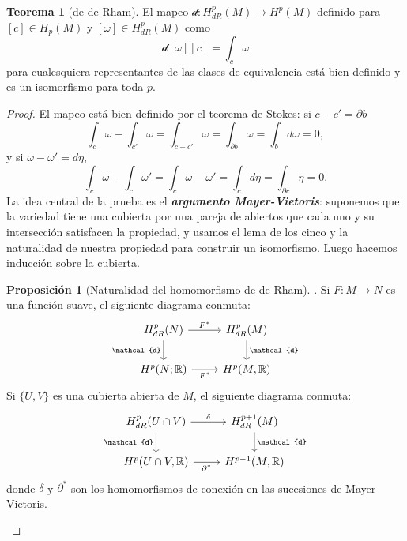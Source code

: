 \documentclass[spanish]{article}
\theoremstyle{definition}
\newtheorem*{teo}{Teorema}
\newtheorem*{prop}{Proposición}
\newcommand{\R}{\mathbb{R}}
\begin{document}
	\begin{teo}[de de Rham]
		El  mapeo $\mathcal{d}:H^p_{dR}(M)\to H^p(M)$ definido para $[c]\in H_p(M)$ y $[\omega]\in H^p_{dR}(M)$ como
		\[\mathcal{d}[\omega][c]=\int_c\omega\]
		para cualesquiera representantes de las clases de equivalencia está bien definido y es un isomorfismo para toda $p$.
	\end{teo}
	\begin{proof}
		El mapeo está bien definido por el teorema de Stokes: si $c-c'=\partial b$
		\[\int_c\omega-\int_{c'}\omega=\int_{c-c'}\omega=\int_{\partial b}\omega=\int_bd\omega=0,\]
		y si $\omega-\omega'=d\eta$,
		\[\int_c\omega-\int_c\omega'=\int_c\omega-\omega'=\int_cd\eta=\int_{\partial c}\eta=0.\]
		La idea central de la prueba es el \textbf{\textit{argumento Mayer-Vietoris}}: suponemos que la variedad tiene una cubierta por una pareja de abiertos que cada uno y su intersección satisfacen la propiedad, y usamos el lema de los cinco y la naturalidad de nuestra propiedad para construir un isomorfismo. Luego hacemos inducción sobre la cubierta.
		 \begin{prop}[Naturalidad del homomorfismo de de Rham]. Si $F:M\to N$ es una función suave, el siguiente diagrama conmuta:
			\[\begin{tikzcd}
				H_{dR}^p(N)\arrow[r,"F^*"]\arrow[d,"\mathcal{d}",swap]&H_{dR}^p(M)\arrow[d,"\mathcal{d}"]\\
				H^p(N;\R)\arrow[r,swap,"F^*"]&H^p(M,\R)
			\end{tikzcd}\]
			Si $\{U,V\}$ es una cubierta abierta de $M$, el siguiente diagrama conmuta:
			\[\begin{tikzcd}
				H^p_{dR}(U\cap V)\arrow[r,"\delta"]\arrow[d,"\mathcal{d}",swap]&H^{p+1}_{dR}(M)\arrow[d,"\mathcal{d}"]\\
				H^p(U\cap V,\R)\arrow[r,"\partial^*",swap]&H^{p-1}(M,\R)
			\end{tikzcd}\]
			donde $\delta$ y $\partial^*$ son los homomorfismos de conexión en las sucesiones de Mayer-Vietoris.
			 \end{prop}
			

\end{proof}
\end{document}
